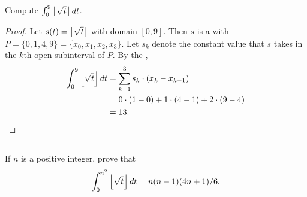 \documentclass{report}
\begin{document}
\subsection{}%
\label{sub:exercise-1.15.7a}

Compute $\int_0^9 \left\lfloor\sqrt{t}\right\rfloor \mathop{dt}$.

\begin{proof}

  Let $s(t) = \left\lfloor\sqrt{t}\right\rfloor$ with domain $[0, 9]$.
  Then $s$ is a  with 
    $P = \{0, 1, 4, 9\} = \{x_0, x_1, x_2, x_3\}$.
  Let $s_k$ denote the constant value that $s$ takes in the $k$th open
    subinterval of $P$.
  By the ,
    \begin{align*}
      \int_0^9 \left\lfloor\sqrt{t}\right\rfloor \mathop{dt}
        & = \sum_{k=1}^3 s_k \cdot (x_k - x_{k-1}) \\
        & = 0 \cdot (1 - 0) + 1 \cdot (4 - 1) + 2 \cdot (9 - 4) \\
        & = 13.
    \end{align*}

\end{proof}

\subsection{}%
\label{sub:exercise-1.15.7b}

If $n$ is a positive integer, prove that
  $$\int_0^{n^2} \left\lfloor\sqrt{t}\right\rfloor \mathop{dt} = n(n - 1)(4n + 1) / 6.$$
\end{document}
